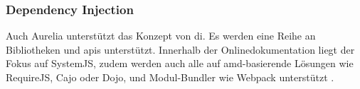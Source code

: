 \subsubsection{Dependency Injection}
Auch Aurelia unterstützt das Konzept von \ac{di}. Es werden eine Reihe an Bibliotheken und \ac{api}s unterstützt. Innerhalb der Onlinedokumentation liegt der Fokus auf SystemJS, zudem werden auch alle auf \ac{amd}-basierende Lösungen wie RequireJS, Cajo oder Dojo, und Modul-Bundler wie Webpack unterstützt \cite{Inc.2016b}.